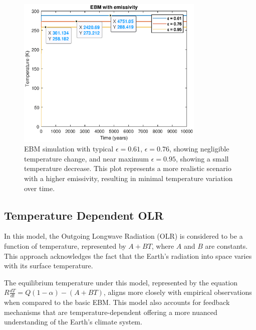 \documentclass[12pt]{article}
\begin{document}
\begin{figure}[H]
    \centering
    \includegraphics[width=0.8\textwidth]{images/ebm_emissivity_diff.eps}
    \caption{EBM simulation with typical $\epsilon=0.61$, $\epsilon=0.76$, showing negligible temperature change, and near maximum $\epsilon=0.95$, showing a small temperature decrease. This plot represents a more realistic scenario with a higher emissivity, resulting in minimal temperature variation over time.}

    \label{fig:ebm_emissivity}
\end{figure}

\subsection{Temperature Dependent OLR}
In this model, the Outgoing Longwave Radiation (OLR) is considered to be a function of temperature, represented by \( A + BT \), where \( A \) and \( B \) are constants. This approach acknowledges the fact that the Earth's radiation into space varies with its surface temperature\cite{kaper-2013-math-ac-budyko}.

The equilibrium temperature under this model, represented by the equation \( R\frac{dT}{dt} = Q(1 - \alpha) - (A + BT) \), aligns more closely with empirical observations when compared to the basic EBM. This model also accounts for feedback mechanisms that are temperature-dependent offering a more nuanced understanding of the Earth's climate system.
\end{document}
